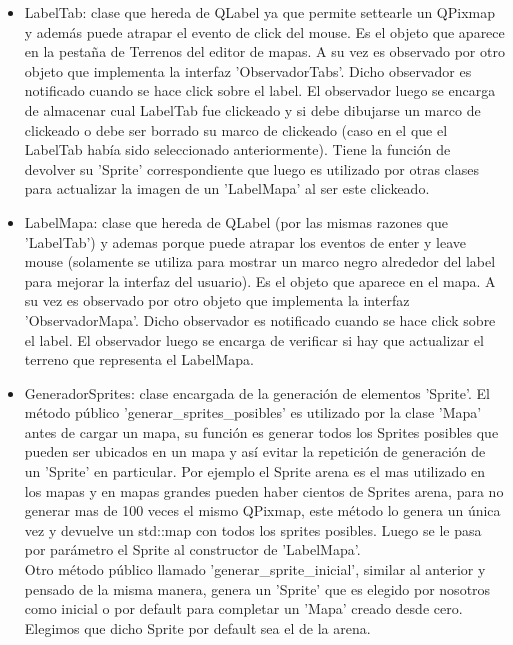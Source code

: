 \documentclass[titlepage,a4paper,12pt]{article}
\begin{document}
\begin{itemize}
\item LabelTab: clase que hereda de QLabel ya que permite settearle un QPixmap y además puede atrapar el evento de click del mouse. Es el objeto que aparece en la pestaña de Terrenos del editor de mapas. A su vez es observado por otro objeto que implementa la interfaz 'ObservadorTabs'. Dicho observador es notificado cuando se hace click sobre el label. El observador luego se encarga de almacenar cual LabelTab fue clickeado y si debe dibujarse un marco de clickeado o debe ser borrado su marco de clickeado (caso en el que el LabelTab había sido seleccionado anteriormente). Tiene la función de devolver su 'Sprite' correspondiente que luego es utilizado por otras clases para actualizar la imagen de un 'LabelMapa' al ser este clickeado.

\item LabelMapa: clase que hereda de QLabel (por las mismas razones que 'LabelTab') y ademas porque puede atrapar los eventos de enter y leave mouse (solamente se utiliza para mostrar un marco negro alrededor del label para mejorar la interfaz del usuario). Es el objeto que aparece en el mapa. A su vez es observado por otro objeto que implementa la interfaz 'ObservadorMapa'. Dicho observador es notificado cuando se hace click sobre el label. El observador luego se encarga de verificar si hay que actualizar el terreno que representa el LabelMapa.


\item GeneradorSprites: clase encargada de la generación de elementos 'Sprite'. El método público 'generar\_sprites\_posibles' es utilizado por la clase 'Mapa' antes de cargar un mapa, su función es generar todos los Sprites posibles que pueden ser ubicados en un mapa y así evitar la repetición de generación de un 'Sprite' en particular. Por ejemplo el Sprite arena es el mas utilizado en los mapas y en mapas grandes pueden haber cientos de Sprites arena, para no generar mas de 100 veces el mismo QPixmap, este método lo genera un única vez y devuelve un std::map con todos los sprites posibles. Luego se le pasa por parámetro el Sprite al constructor de 'LabelMapa'.\\

Otro método público llamado 'generar\_sprite\_inicial', similar al anterior y pensado de la misma manera, genera un 'Sprite' que es elegido por nosotros como inicial o por default para completar un 'Mapa' creado desde cero. Elegimos que dicho Sprite por default sea el de la arena.\\


\end{itemize}
\end{document}
